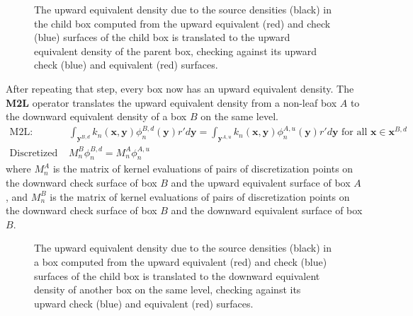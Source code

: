 \begin{figure}[!ht]
\begin{center}
\end{center}
\caption{The upward equivalent density due to the source densities (black) in the child box computed from the upward equivalent (red) and check (blue) surfaces of the child box is translated to the upward equivalent density of the parent box, checking against its upward check (blue) and equivalent (red) surfaces.}
\end{figure}

After repeating that step, every box now has an upward equivalent density. The \textbf{M2L} operator translates the upward equivalent density from a non-leaf box $A$ to the downward equivalent density of a box $B$ on the same level.
\begin{align}
\mbox{M2L: }&\int_{\mathbf{y}^{B,d}}{k_n(\mathbf{x},\mathbf{y})}\phi^{B,d}_n{(\mathbf{y})}r'd\mathbf{y} = \int_{\mathbf{y}^{A,u}}{k_n(\mathbf{x},\mathbf{y})}\phi^{A,u}_n{(\mathbf{y})}r'd\mathbf{y}\mbox{ for all }\mathbf{x}\in\mathbf{x}^{B,d}\\
\mbox{Discretized M2L: }&M_n^B\phi^{B,d}_n=M_n^A\phi^{A,u}_n
\end{align}
where $M_n^A$ is the matrix of kernel evaluations of pairs of discretization points on the downward check surface of box $B$ and the upward equivalent surface of box $A$, and $M_n^B$ is the matrix of kernel evaluations of pairs of discretization points on the downward check surface of box $B$ and the downward equivalent surface of box $B$.

\begin{figure}[!ht]
\begin{center}
\end{center}
\caption{The upward equivalent density due to the source densities (black) in a box computed from the upward equivalent (red) and check (blue) surfaces of the child box is translated to the downward equivalent density of another box on the same level, checking against its upward check (blue) and equivalent (red) surfaces.}
\end{figure}

